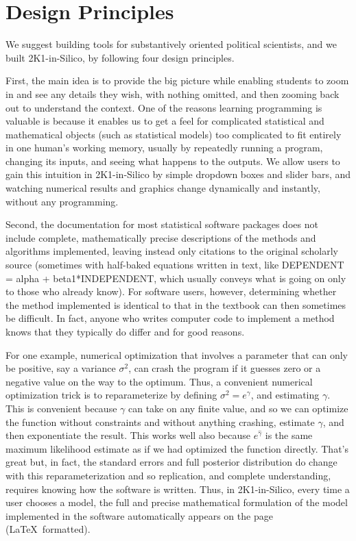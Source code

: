 \documentclass[12pt]{article}
\theoremstyle{definition}
\begin{document}
\section{Design Principles}

We suggest building tools for substantively oriented political scientists, and we built 2K1-in-Silico, by following four design principles.

First, the main idea is to provide the big picture while enabling students to zoom in and see any details they wish, with nothing omitted, and then zooming back out to understand the context. One of the reasons learning programming is valuable is because it enables us to get a feel for complicated statistical and mathematical objects (such as statistical models) too complicated to fit entirely in one human's working memory, usually by repeatedly running a program, changing its inputs, and seeing what happens to the outputs. We allow users to gain this intuition in 2K1-in-Silico by simple dropdown boxes and slider bars, and watching numerical results and graphics change dynamically and instantly, without any programming.

Second, the documentation for most statistical software packages does not include complete, mathematically precise descriptions of the methods and algorithms implemented, leaving instead only citations to the original scholarly source (sometimes with half-baked equations written in text, like DEPENDENT = alpha + beta1*INDEPENDENT, which usually conveys what is going on only to those who already know). For software users, however, determining whether the method implemented is identical to that in the textbook can then sometimes be difficult. In fact, anyone who writes computer code to implement a method knows that they typically do differ and for good reasons.

For one example, numerical optimization that involves a parameter that can only be positive, say a variance $\sigma^2$, can crash the program if it guesses zero or a negative value on the way to the optimum. Thus, a convenient numerical optimization trick is to reparameterize by defining $\sigma^2=e^\gamma$, and estimating $\gamma$. This is convenient because $\gamma$ can take on any finite value, and so we can optimize the function without constraints and without anything crashing, estimate $\gamma$, and then exponentiate the result. This works well also because $e^{\hat\gamma}$ is the same maximum likelihood estimate as if we had optimized the function directly. That's great but, in fact, the standard errors and full posterior distribution do change with this reparameterization and so replication, and complete understanding, requires knowing how the software is written. Thus, in 2K1-in-Silico, every time a user chooses a model, the full and precise mathematical formulation of the model implemented in the software automatically appears on the page (\LaTeX\ formatted).
\end{document}
